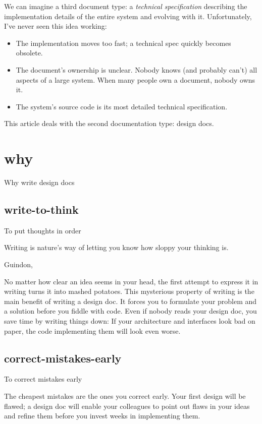 \documentclass{article}
\begin{document}
We can imagine a third document type: a \emph{technical specification} describing the implementation details of the entire system and evolving with it.
Unfortunately, I've never seen this idea working:
\begin{itemize}
\item
  The implementation moves too fast; a technical spec quickly becomes obsolete.
\item The document's ownership is unclear.
  Nobody knows (and probably can't) all aspects of a large system.
  When many people own a document, nobody owns it.
\item
  The system's source code is its most detailed technical specification.
\end{itemize}

This article deals with the second documentation type: design docs.

\section{why}{Why write design docs}

\subsection{write-to-think}{To put thoughts in order}

\epigraph{
  Writing is nature's way of letting you know how sloppy your thinking is.
}{Guindon, \cite{San Francisco Chronicle, 3/1/89 Guindon}}

No matter how clear an idea seems in your head, the first attempt to express it in writing turns it into mashed potatoes.
This mysterious property of writing is the main benefit of writing a design doc.
It forces you to formulate your problem and a solution before you fiddle with code.
Even if nobody reads your design doc, you save time by writing things down:
If your architecture and interfaces look bad on paper, the code implementing them will look even worse.

\subsection{correct-mistakes-early}{To correct mistakes early}

The cheapest mistakes are the ones you correct early.
Your first design will be flawed;
a design doc will enable your colleagues to point out flaws in your ideas and refine them before you invest weeks in implementing them.
\end{document}
